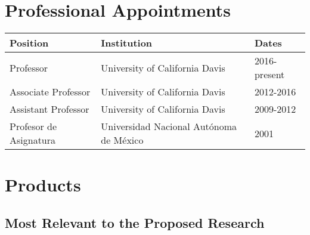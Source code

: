 \documentclass[10pt]{article}
\begin{document}
\section{Professional Appointments}

\begin{tabular}{l l l}
Position & Institution                 & Dates\\
\hline
Professor & University of California Davis &		2016-present \\
Associate Professor & University of California Davis &		2012-2016 \\
Assistant Professor & University of California Davis &		2009-2012 \\
Profesor de Asignatura & Universidad Nacional Aut\'{o}noma de M\'{e}xico & 2001 \\
\end{tabular}

\section{Products}

\subsection*{Most Relevant to the Proposed Research}
\end{document}
